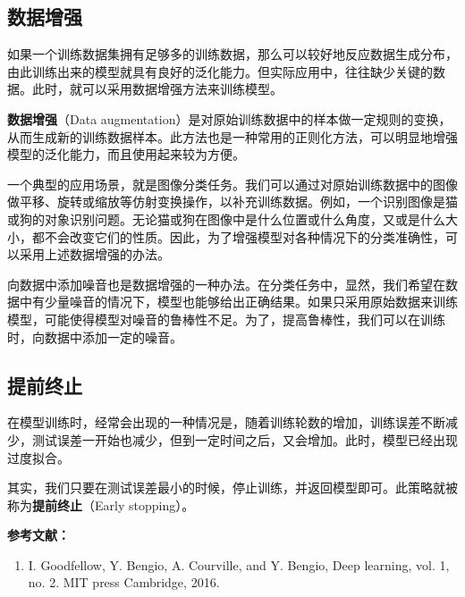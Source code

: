 \subsection{数据增强}

如果一个训练数据集拥有足够多的训练数据，那么可以较好地反应数据生成分布，由此训练出来的模型就具有良好的泛化能力。但实际应用中，往往缺少关键的数据。此时，就可以采用数据增强方法来训练模型。

\textbf{数据增强}（Data augmentation）是对原始训练数据中的样本做一定规则的变换，从而生成新的训练数据样本。此方法也是一种常用的正则化方法，可以明显地增强模型的泛化能力，而且使用起来较为方便。

一个典型的应用场景，就是图像分类任务。我们可以通过对原始训练数据中的图像做平移、旋转或缩放等仿射变换操作，以补充训练数据。例如，一个识别图像是猫或狗的对象识别问题。无论猫或狗在图像中是什么位置或什么角度，又或是什么大小，都不会改变它们的性质。因此，为了增强模型对各种情况下的分类准确性，可以采用上述数据增强的办法。

向数据中添加噪音也是数据增强的一种办法。在分类任务中，显然，我们希望在数据中有少量噪音的情况下，模型也能够给出正确结果。如果只采用原始数据来训练模型，可能使得模型对噪音的鲁棒性不足。为了，提高鲁棒性，我们可以在训练时，向数据中添加一定的噪音。


\subsection{提前终止}

在模型训练时，经常会出现的一种情况是，随着训练轮数的增加，训练误差不断减少，测试误差一开始也减少，但到一定时间之后，又会增加。此时，模型已经出现过度拟合。

其实，我们只要在测试误差最小的时候，停止训练，并返回模型即可。此策略就被称为\textbf{提前终止}（Early stopping）。


\textbf{参考文献：}
\begin{enumerate}
\item I. Goodfellow, Y. Bengio, A. Courville, and Y. Bengio, Deep learning, vol. 1, no. 2. MIT press Cambridge, 2016.
\end{enumerate}